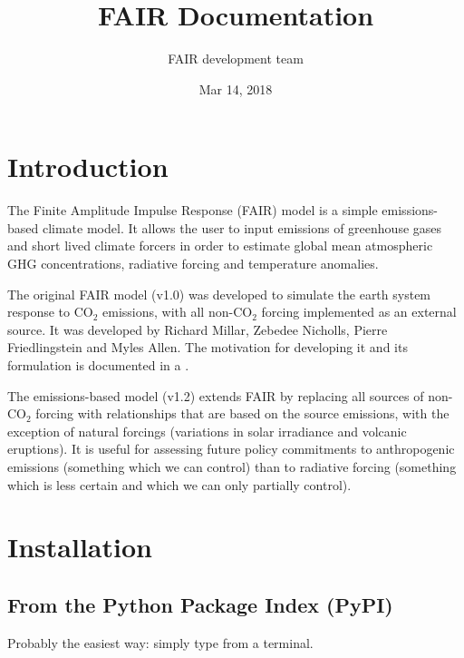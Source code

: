 \documentclass[letterpaper,10pt,english]{sphinxmanual}
\title{FAIR Documentation}
\date{Mar 14, 2018}
\author{FAIR development team}
\begin{document}
\maketitle
\sphinxtableofcontents
{}\label{\detokenize{index::doc}}



\chapter{Introduction}
\label{\detokenize{intro:introduction}}\label{\detokenize{intro:fair-finite-amplitude-impulse-response-simple-climate-model}}\label{\detokenize{intro::doc}}
The Finite Amplitude Impulse Response (FAIR) model is a simple
emissions-based climate model. It allows the user to input emissions of
greenhouse gases and short lived climate forcers in order to estimate
global mean atmospheric GHG concentrations, radiative forcing and
temperature anomalies.

The original FAIR model (v1.0) was developed to simulate the earth
system response to CO$_{\text{2}}$ emissions, with all non-CO$_{\text{2}}$ forcing implemented as an \sphinxquotedblleft{}external\sphinxquotedblright{} source. It was developed by Richard
Millar, Zebedee Nicholls, Pierre Friedlingstein and Myles Allen. The
motivation for developing it and its formulation is documented in a
.

The emissions-based model (v1.2) extends FAIR by replacing all sources of
non-CO$_{\text{2}}$ forcing with relationships that are based on the
source emissions, with the exception of natural forcings (variations
in solar irradiance and volcanic eruptions). It is useful for
assessing future policy commitments to anthropogenic emissions
(something which we can control) than to radiative forcing (something
which is less certain and which we can only partially control).


\chapter{Installation}
\label{\detokenize{installation:installation}}\label{\detokenize{installation::doc}}

\section{From the Python Package Index (PyPI)}
\label{\detokenize{installation:from-the-python-package-index-pypi}}
Probably the easiest way: simply type  from a terminal.
\end{document}
